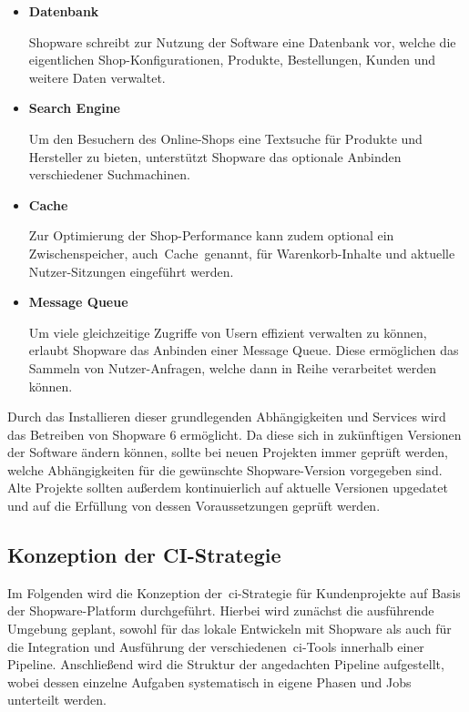 \begin{itemize}
    \item {
        \textbf{Datenbank}\par
        Shopware schreibt zur Nutzung der Software eine Datenbank vor, welche die eigentlichen Shop-Konfigurationen,
        Produkte, Bestellungen, Kunden und weitere Daten verwaltet.
    }

    \item {
        \textbf{Search Engine}\par
        Um den Besuchern des Online-Shops eine Textsuche für Produkte und Hersteller zu bieten, unterstützt Shopware
        das optionale Anbinden verschiedener Suchmachinen.
    }

    \item {
        \textbf{Cache}\par
        Zur Optimierung der Shop-Performance kann zudem optional ein Zwischenspeicher, auch\ \glqq Cache\grqq\ genannt,
        für Warenkorb-Inhalte und aktuelle Nutzer-Sitzungen eingeführt werden.
    }

    \item {
        \textbf{Message Queue}\par
        Um viele gleichzeitige Zugriffe von Usern effizient verwalten zu können, erlaubt Shopware das Anbinden einer
        Message Queue.
        Diese ermöglichen das Sammeln von Nutzer-Anfragen, welche dann in Reihe verarbeitet werden können.
    }
\end{itemize}

Durch das Installieren dieser grundlegenden Abhängigkeiten und Services wird das Betreiben von Shopware 6 ermöglicht.
Da diese sich in zukünftigen Versionen der Software ändern können, sollte bei neuen Projekten immer geprüft werden,
welche Abhängigkeiten für die gewünschte Shopware-Version vorgegeben sind.
Alte Projekte sollten außerdem kontinuierlich auf aktuelle Versionen upgedatet und auf die Erfüllung von dessen
Voraussetzungen geprüft werden.

\subsection{Konzeption der CI-Strategie} \label{subsec:03-concept-3}

Im Folgenden wird die Konzeption der\ \acrshort{ci}-Strategie für Kundenprojekte auf Basis der Shopware-Platform
durchgeführt.
Hierbei wird zunächst die ausführende Umgebung geplant, sowohl für das lokale Entwickeln mit Shopware als auch für die
Integration und Ausführung der verschiedenen\ \acrshort{ci}-Tools innerhalb einer Pipeline.
Anschließend wird die Struktur der angedachten Pipeline aufgestellt, wobei dessen einzelne Aufgaben systematisch in
eigene Phasen und Jobs unterteilt werden.

